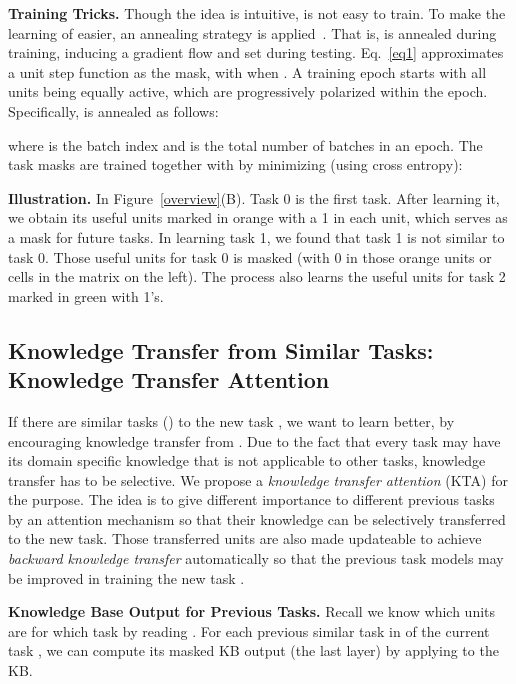 \documentclass{article}
\begin{document}
\textbf{Training Tricks.} 
Though the idea is intuitive,  is not easy to train. To make the learning of  easier, an annealing strategy is applied~\citep{Serra2018overcoming}. That is,  is annealed during training, inducing a gradient flow and set  during testing. {\color{black}Eq.~\ref{eq1} approximates a unit step function as the mask, with  when . 
A training epoch starts with all units being equally active, which are progressively polarized within the epoch. Specifically,  is annealed as follows}:

where  is the batch index and  is the total number of batches in an epoch. The task masks are trained together with 
 by minimizing (using cross entropy):

\textbf{Illustration.} In Figure~\ref{overview}(B). Task 0 is the first task. After learning it, we obtain its useful units marked in orange with a 1 in each unit, which serves as a mask for future tasks. In learning task 1, we found that task 1 is not similar to task 0. Those useful units for task 0 is masked (with 0 in those orange units or cells in the matrix on the left). The process also learns the useful units for task 2 marked in green with 1's. 

\subsection{Knowledge Transfer from Similar Tasks: Knowledge Transfer Attention}

If there are similar tasks () to the new task , we want to learn  better, by encouraging knowledge transfer from . Due to the fact that every task may have its domain specific knowledge that is not applicable to other tasks, knowledge transfer has to be selective.  
We propose a \textit{knowledge transfer attention} (KTA) for the purpose. The idea is to give different importance to different previous tasks by an attention mechanism so that their knowledge can be selectively transferred to the new task. Those transferred units are also made updateable to achieve \textit{backward knowledge transfer} automatically so that the previous task models may be improved in training the new task .

\textbf{Knowledge Base Output for Previous Tasks.} Recall we know which units are for which task  by reading . For each previous similar task  in  of the current task , we can compute its masked KB output  (the last layer) by applying  to the KB.
\end{document}

